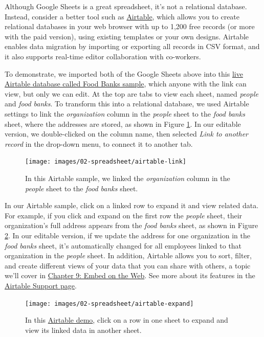 \documentclass[
  english,
]{book}
\begin{document}
Although Google Sheets is a great spreadsheet, it's not a relational database. Instead, consider a better tool such as \href{https://airtable.com}{Airtable}, which allows you to create relational databases in your web browser with up to 1,200 free records (or more with the paid version), using existing templates or your own designs. Airtable enables data migration by importing or exporting all records in CSV format, and it also supports real-time editor collaboration with co-workers.

To demonstrate, we imported both of the Google Sheets above into this \href{https://airtable.com/shrOlb4XT11Xy2LP2}{live Airtable database called Food Banks sample}, which anyone with the link can view, but only we can edit. At the top are tabs to view each sheet, named \emph{people} and \emph{food banks}. To transform this into a relational database, we used Airtable settings to link the \emph{organization} column in the \emph{people} sheet to the \emph{food banks} sheet, where the addresses are stored, as shown in Figure \ref{fig:airtable-link}. In our editable version, we double-clicked on the column name, then selected \emph{Link to another record} in the drop-down menu, to connect it to another tab.



\begin{figure}
\texttt{[image: images/02-spreadsheet/airtable-link]} \caption{In this Airtable sample, we linked the \emph{organization} column in the \emph{people} sheet to the \emph{food banks} sheet.}\label{fig:airtable-link}
\end{figure}

In our Airtable sample, click on a linked row to expand it and view related data. For example, if you click and expand on the first row the \emph{people} sheet, their organization's full address appears from the \emph{food banks} sheet, as shown in Figure \ref{fig:airtable-expand}. In our editable version, if we update the address for one organization in the \emph{food banks} sheet, it's automatically changed for all employees linked to that organization in the \emph{people} sheet. In addition, Airtable allows you to sort, filter, and create different views of your data that you can share with others, a topic we'll cover in \href{embed.html}{Chapter 9: Embed on the Web}. See more about its features in the \href{https://support.airtable.com}{Airtable Support page}.



\begin{figure}
\texttt{[image: images/02-spreadsheet/airtable-expand]} \caption{In this \href{https://airtable.com/shrOlb4XT11Xy2LP2}{Airtable demo}, click on a row in one sheet to expand and view its linked data in another sheet.}\label{fig:airtable-expand}
\end{figure}
\end{document}
